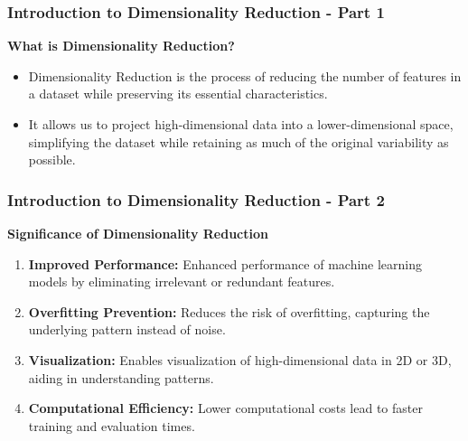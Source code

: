 \documentclass{beamer}
\begin{document}
\begin{frame}[fragile]
    \frametitle{Introduction to Dimensionality Reduction - Part 1}
    \textbf{What is Dimensionality Reduction?}
    \begin{itemize}
        \item Dimensionality Reduction is the process of reducing the number of features in a dataset while preserving its essential characteristics.
        \item It allows us to project high-dimensional data into a lower-dimensional space, simplifying the dataset while retaining as much of the original variability as possible.
    \end{itemize}
\end{frame}

\begin{frame}[fragile]
    \frametitle{Introduction to Dimensionality Reduction - Part 2}
    \textbf{Significance of Dimensionality Reduction}
    \begin{enumerate}
        \item \textbf{Improved Performance:} Enhanced performance of machine learning models by eliminating irrelevant or redundant features.
        \item \textbf{Overfitting Prevention:} Reduces the risk of overfitting, capturing the underlying pattern instead of noise.
        \item \textbf{Visualization:} Enables visualization of high-dimensional data in 2D or 3D, aiding in understanding patterns.
        \item \textbf{Computational Efficiency:} Lower computational costs lead to faster training and evaluation times.
    \end{enumerate}
\end{frame}
\end{document}
